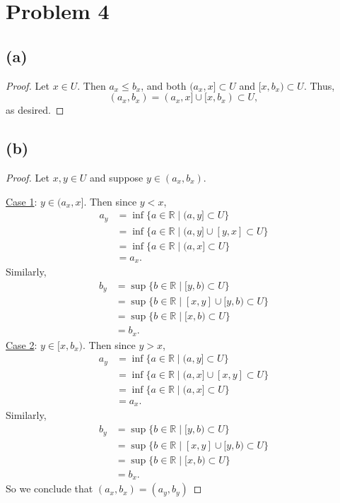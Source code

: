 \documentclass{article}
\begin{document}
\section*{Problem 4}
\subsection*{(a)}
\begin{proof}
	Let $x \in U$. Then $a_x \leq b_x$, and both $(a_x, x]\subset U$ and $[x, b_x) \subset U$. Thus, 
	\begin{equation}
		(a_x, b_x) = (a_x, x] \cup [x, b_x) \subset U,
	\end{equation} 
	as desired.
\end{proof}

\subsection*{(b)}
\begin{proof}
	Let $x,y \in U$ and suppose $y\in(a_x,b_x)$. 
	
	\underline{Case 1}: $y\in (a_x,x]$. Then since $y<x$,
	\begin{align}
		a_y &= \inf\{a\in\mathbb{R} \;|\; (a, y] \subset U\} \\
		&= \inf\{a\in\mathbb{R} \;|\; (a, y]\cup[y,x] \subset U\} \\
		&= \inf\{a\in\mathbb{R} \;|\; (a, x] \subset U\}\\
		&= a_x.
	\end{align}
	Similarly,
	\begin{align}
		b_y &= \sup \{b\in\mathbb{R} \;|\; [y,b)\subset U\} \\
		&= \sup\{b\in\mathbb{R} \;|\; [x,y]\cup[y,b) \subset U\} \\
		&= \sup \{b\in\mathbb{R} \;|\; [x,b) \subset U\}\\
		&= b_x.
	\end{align}
	\underline{Case 2}: $y \in [x, b_x)$. Then since $y>x$,
	\begin{align}
		a_y &= \inf\{a\in\mathbb{R} \;|\; (a, y] \subset U\} \\
		&= \inf \{a\in\mathbb{R} \;|\; (a,x]\cup[x,y] \subset U\} \\
		&= \inf \{a\in\mathbb{R} \;|\; (a,x] \subset U\} \\
		&= a_x.
	\end{align}
	Similarly,
	\begin{align}
		b_y &= \sup\{b\in\mathbb{R} \;|\; [y, b) \subset U\} \\
		&= \sup\{b\in\mathbb{R} \;|\; [x,y]\cup[y,b) \subset U\} \\
		&= \sup\{b\in\mathbb{R} \;|\; [x,b) \subset U\} \\
		&= b_x.
	\end{align}
	So we conclude that $(a_x, b_x) = (a_y,b_y)$
\end{proof}
\end{document}
